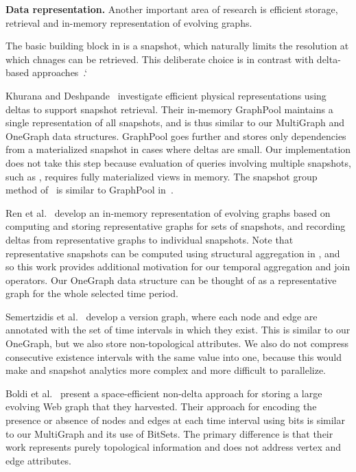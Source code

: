 {\bf Data representation.}  Another important area of research is
efficient storage, retrieval and in-memory representation of evolving
graphs.  

The basic building block in \ql is a snapshot, which naturally limits
the resolution at which chnages can be retrieved. This deliberate
choice is in contrast with delta-based
approaches~\cite{Khurana2013,Koloniari2012,DBLP:journals/tos/MiaoHLWYZPCC15}.`

Khurana and Deshpande~\cite{Khurana2013} investigate efficient
physical representations using deltas to support snapshot retrieval.
Their in-memory GraphPool maintains a single representation of all
snapshots, and is thus similar to our MultiGraph and OneGraph data
structures.  GraphPool goes further and stores only dependencies from
a materialized snapshot in cases where deltas are small.  Our
implementation does not take this step because evaluation of queries
involving multiple snapshots, such as , requires fully
materialized views in memory.  The snapshot group method
of~\cite{DBLP:journals/tos/MiaoHLWYZPCC15} is similar to GraphPool
in~\cite{Khurana2013}.

Ren et al.~\cite{Ren2011} develop an in-memory representation of
evolving graphs based on computing and storing representative graphs
for sets of snapshots, and recording deltas from representative graphs
to individual snapshots.  Note that representative snapshots can be
computed using structural aggregation in \ql, and so this work
provides additional motivation for our temporal aggregation and join
operators.  Our OneGraph data structure can be thought of as a
representative graph for the whole selected time period.

Semertzidis et al.~\cite{Semertzidis2015} develop a version graph,
where each node and edge are annotated with the set of time intervals
in which they exist.  This is similar to our OneGraph, but we also
store non-topological attributes.  We also do not compress consecutive
existence intervals with the same value into one, because this would
make  and snapshot analytics more complex and more
difficult to parallelize.

Boldi et al.~\cite{Boldi2008} present a space-efficient non-delta
approach for storing a large evolving Web graph that they harvested.
Their approach for encoding the presence or absence of nodes and edges
at each time interval using bits is similar to our MultiGraph and its
use of BitSets.  The primary difference is that their work represents
purely topological information and does not address vertex and edge
attributes.

